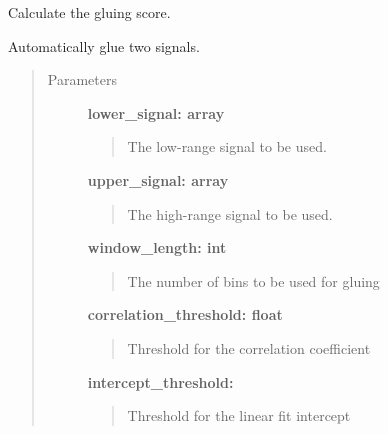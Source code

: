 \documentclass[letterpaper,10pt,english]{sphinxmanual}
\begin{document}

\begin{fulllineitems}
\label{pre_processing:pre_processing.get_gluing_score}
Calculate the gluing score.

\end{fulllineitems}


\begin{fulllineitems}
\label{pre_processing:pre_processing.glue_signals}
Automatically glue two signals.
\begin{quote}\begin{description}
\item[{Parameters}] \leavevmode
\textbf{lower\_signal: array}
\begin{quote}

The low-range signal to be used.
\end{quote}

\textbf{upper\_signal: array}
\begin{quote}

The high-range signal to be used.
\end{quote}

\textbf{window\_length: int}
\begin{quote}

The number of bins to be used for gluing
\end{quote}

\textbf{correlation\_threshold: float}
\begin{quote}

Threshold for the correlation coefficient
\end{quote}

\textbf{intercept\_threshold:}
\begin{quote}

Threshold for the linear fit intercept
\end{quote}


\end{description}
\end{quote}
\end{fulllineitems}
\end{document}
